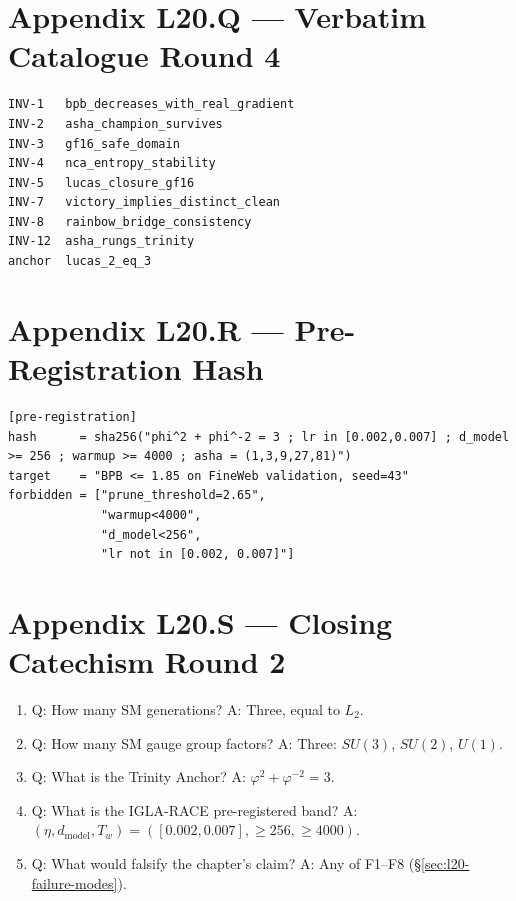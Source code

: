 \section{Appendix L20.Q — Verbatim Catalogue Round 4}
\label{sec:l20-appendix-Q}

\begin{verbatim}
INV-1   bpb_decreases_with_real_gradient
INV-2   asha_champion_survives
INV-3   gf16_safe_domain
INV-4   nca_entropy_stability
INV-5   lucas_closure_gf16
INV-7   victory_implies_distinct_clean
INV-8   rainbow_bridge_consistency
INV-12  asha_rungs_trinity
anchor  lucas_2_eq_3
\end{verbatim}

\section{Appendix L20.R — Pre-Registration Hash}
\label{sec:l20-appendix-R}

\begin{verbatim}
[pre-registration]
hash      = sha256("phi^2 + phi^-2 = 3 ; lr in [0.002,0.007] ; d_model >= 256 ; warmup >= 4000 ; asha = (1,3,9,27,81)")
target    = "BPB <= 1.85 on FineWeb validation, seed=43"
forbidden = ["prune_threshold=2.65",
             "warmup<4000",
             "d_model<256",
             "lr not in [0.002, 0.007]"]
\end{verbatim}

\section{Appendix L20.S — Closing Catechism Round 2}
\label{sec:l20-appendix-S}

\begin{enumerate}
  \item Q: How many SM generations?
        A: Three, equal to $L_{2}$.
  \item Q: How many SM gauge group factors?
        A: Three: $SU(3)$, $SU(2)$, $U(1)$.
  \item Q: What is the Trinity Anchor?
        A: $\varphi^{2} + \varphi^{-2} = 3$.
  \item Q: What is the IGLA-RACE pre-registered band?
        A: $(\eta, d_{\text{model}}, T_{w}) = ([0.002, 0.007], \geq 256, \geq 4000)$.
  \item Q: What would falsify the chapter's claim?
        A: Any of F1--F8 (\S\ref{sec:l20-failure-modes}).
\end{enumerate}


